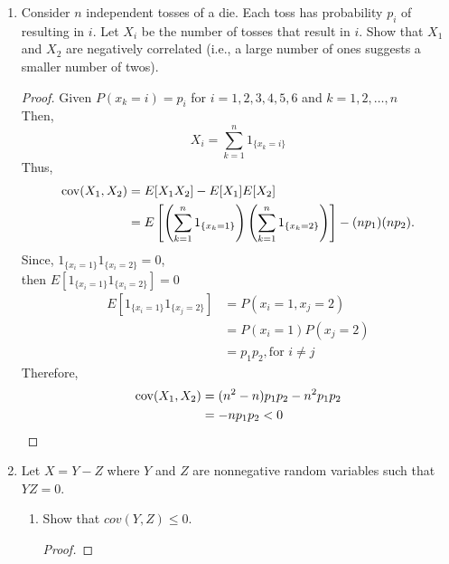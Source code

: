 \documentclass[paper=usletter, fontsize=12pt]{article}
\begin{document}
\begin{enumerate}
\begin{proof}
        \end{proof}

        \item Consider $n$ independent tosses of a die. Each toss has
        probability $p_i$ of resulting in $i$. Let $X_i$ be the number of
        tosses that result in $i$. Show that $X_1$ and $X_2$ are negatively
        correlated (i.e., a large number of ones suggests a smaller number of
        twos).
        \begin{proof}

            Given $P(x_k=i)=p_i$ for $i=1,2,3,4,5,6$ and $k=1,2,\ldots,n$ \\ Then,
            \begin{equation*}
                X_i = \sum_{k=1}^n 1_{\{x_k=i\}}
            \end{equation*}
            Thus,
            \begin{align*}
                \operatorname{cov}(X_1,X_2) &= E[X_1X_2]-E[X_1]E[X_2]\\
                &= E\left[\left(\sum_{k=1}^n1_{\{x_k=1\}}\right)\left(\sum_{k=1}^n1_{\{x_k=2\}}\right)\right] - (np_1)(np_2).\\
            \end{align*}
            \endgroup
            Since, $1_{\{x_i=1\}}1_{\{x_i=2\}}=0$,\\
            then $E\left[1_{\{x_i=1\}}1_{\{x_i=2\}}\right]=0$
            \begin{align*}
                E\left[1_{\{x_i=1\}}1_{\{x_j=2\}}\right] &= P(x_i=1,x_j=2)\\
                & =P(x_i=1)P(x_j=2) \\
                &= p_1p_2, \text{for $i\ne j$}
            \end{align*}
            Therefore,
            \begin{align*}
                \operatorname{cov}(X_1,X_2) &= (n^2-n)p_1p_2 -n^2p_1p_2 \\
                & =-np_1p_2 <0 \qedhere
            \end{align*}

        \end{proof}

        \item Let $X=Y-Z$ where $Y$ and $Z$ are nonnegative random variables
        such that $YZ=0$.
        \begin{enumerate}

            \item Show that $cov(Y,Z) \le 0$.
            \begin{proof}


\end{proof}
\end{enumerate}
\end{enumerate}
\end{document}
